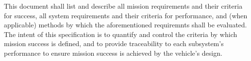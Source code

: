 This document shall list and describe all mission requirements and their
criteria for success, all system requirements and their criteria for
performance, and (when applicable) methods by which the aforementioned
requiremnts shall be evaluated. The intent of this specification is to quantify
and control the criteria by which mission success is defined, and to provide
traceability to each subsystem's performance to ensure mission success is
achieved by the vehicle's design.
